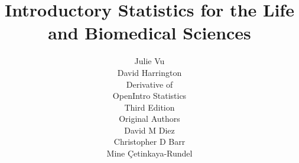 

\title{\huge Introductory Statistics for the Life and Biomedical Sciences}


\author{\large Julie Vu \\
\large David Harrington \\ [40mm]
\Large Derivative of \\
\Large OpenIntro Statistics \\
\Large Third Edition \\[1.5mm]
\large Original Authors \\ [1.5mm]
\large David M Diez \\ 
\large Christopher D Barr \\
\large Mine \c{C}etinkaya-Rundel
}

